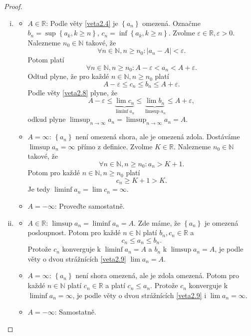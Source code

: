\begin{proof}\,
\begin{enumerate}[(i)]
	\item[$\implies$] \begin{itemize}
		\item $A \in \mathbb R $: Podle věty \ref{veta2.4} je
		$\left \{ a_n \right \} $ omezená. Označme $b_n = \sup \left \{ a_k, k \geq n \right \}$,
		$c_n = \inf \left \{ a_k, k \geq n \right \} $. Zvolme $\varepsilon \in \mathbb R , \varepsilon> 0.$
		Nalezneme $n_0 \in \mathbb N $ takové, že
		$$
		\forall n \in \mathbb N, n \geq n_0: |a_n- A| < \varepsilon.
		$$
		Potom platí
		$$
		    \forall n\in \mathbb N, n \geq n_0: A - \varepsilon < a_n < A + \varepsilon.
		$$
		Odtud plyne, že pro každé $n \in \mathbb N, n \geq n_0$ platí
		$$
		    A - \varepsilon \leq c_n \leq b_n \leq A+ \varepsilon.
		$$
		Podle věty \ref{veta2.8}
		plyne, že
		$$
		    A- \varepsilon \leq \underbrace{\lim c_n}_{\liminf a_n} \leq \underbrace{\lim b_n}_{\limsup a_n} \leq A+\varepsilon,
		$$
		odkud plyne $\limsup_{n\to\infty} a_n = \limsup_{n\to\infty} a_n = A.$
		\item $A = \infty$: $\left \{ a_n \right \} $ není omezená shora, ale je omezená zdola.
		Dostáváme $\limsup a_n = \infty$ přímo z definice. Zvolme $K\in \mathbb R $. Nalezneme $n_0 \in \mathbb N$
		takové, že
		$$
		    \forall n \in \mathbb N , n \geq n_0: a_n > K + 1.
		$$
		Potom pro každé $n \in \mathbb N, n \geq n_0$ platí
		$$
		    c_n \geq K + 1 > K.
		$$
		Je tedy $\liminf a_n = \lim c_n = \infty$.
		\item $A = -\infty$: Proveďte samostatně.
\end{itemize}
\item[$\impliedby$] \begin{itemize}
	\item $A \in \mathbb R $: $\limsup a_n = \liminf a_n = A$. Zde máme, že $\left \{ a_n \right \} $
	je omezená posloupnost. Potom pro každé $n \in \mathbb N $ platí $b_n, c_n\in \mathbb R $ a
	$$
	    c_n \leq a_n \leq b_n.
	$$
	Protože $c_n$ konverguje k $\liminf a_n = A$ a $b_n$ k $\limsup a_n = A$, je podle věty o dvou strážnících
	\ref{veta2.9}
	$\lim a_n = A$.
	\item $A = \infty$: $\left \{ a_n \right \} $ není shora omezená, ale je zdola omezená.
	Potom pro každé $n \in \mathbb N $ platí $c_n \in \mathbb R $ a platí $c_n \leq a_n$.
	Protože $c_n$ konverguje k $\liminf a_n = \infty$, je podle věty
	o dvou strážnících \ref{veta2.9}
	i $\lim a_n = \infty$.
	\item $A = -\infty$: Samostatně. \qedhere
\end{itemize}
\end{enumerate}
\end{proof}

